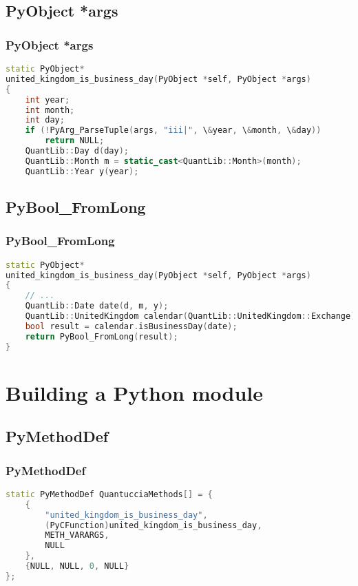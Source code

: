 \documentclass{beamer}
\begin{document}
	\subsection{PyObject *args}
	\begin{frame}[fragile]
		\frametitle{PyObject *args}
		\begin{lstlisting}[language=C++]
   static PyObject*
united_kingdom_is_business_day(PyObject *self, PyObject *args)
{
    int year;
    int month;
    int day;
    if (!PyArg_ParseTuple(args, "iii|", \&year, \&month, \&day))
        return NULL;
    QuantLib::Day d(day);
    QuantLib::Month m = static_cast<QuantLib::Month>(month);
    QuantLib::Year y(year);
		\end{lstlisting}
	\end{frame}

	\subsection{PyBool\_FromLong}
	\begin{frame}[fragile]
		\frametitle{PyBool\_FromLong}
		\begin{lstlisting}[language=C++]
   static PyObject*
united_kingdom_is_business_day(PyObject *self, PyObject *args)
{
    // ...
    QuantLib::Date date(d, m, y);
    QuantLib::UnitedKingdom calendar(QuantLib::UnitedKingdom::Exchange);
    bool result = calendar.isBusinessDay(date);
    return PyBool_FromLong(result);
}
 		\end{lstlisting}
	\end{frame}


	\section{Building a Python module}

	\subsection{PyMethodDef}
	\begin{frame}[fragile]
		\frametitle{PyMethodDef}
		\begin{lstlisting}[language=C++]
static PyMethodDef QuantucciaMethods[] = {
    {
        "united_kingdom_is_business_day",
        (PyCFunction)united_kingdom_is_business_day,
        METH_VARARGS,
        NULL
    },
    {NULL, NULL, 0, NULL}
};
		\end{lstlisting}
	\end{frame}
\end{document}
